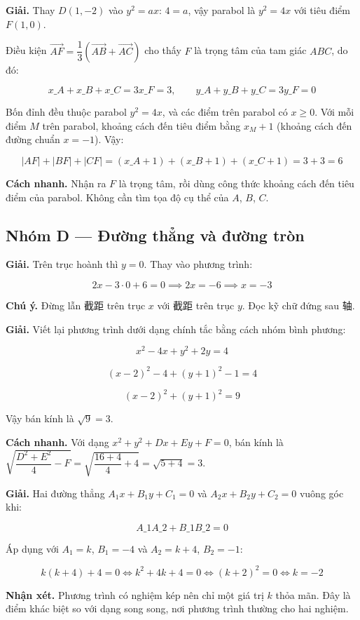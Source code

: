 \documentclass[11pt, a4paper]{article}
\begin{document}
\begin{dapan}[19 — Đáp án C]
\textbf{Giải.} Thay $D(1,-2)$ vào $y^2 = ax$: $4 = a$, vậy parabol là $y^2 = 4x$ với tiêu điểm $F(1, 0)$.

Điều kiện $\overrightarrow{AF} = \dfrac{1}{3}(\overrightarrow{AB} + \overrightarrow{AC})$ cho thấy $F$ là trọng tâm của tam giác $ABC$, do đó:

$$x\_A + x\_B + x\_C = 3x\_F = 3, \qquad y\_A + y\_B + y\_C = 3y\_F = 0$$

Bốn đỉnh đều thuộc parabol $y^2 = 4x$, và các điểm trên parabol có $x \ge 0$. Với mỗi điểm $M$ trên parabol, khoảng cách đến tiêu điểm bằng $x_M + 1$ (khoảng cách đến đường chuẩn $x = -1$). Vậy:

$$\lvert AF \rvert + \lvert BF \rvert + \lvert CF \rvert = (x\_A + 1) + (x\_B + 1) + (x\_C + 1) = 3 + 3 = 6$$

\textbf{Cách nhanh.} Nhận ra $F$ là trọng tâm, rồi dùng công thức khoảng cách đến tiêu điểm của parabol. Không cần tìm tọa độ cụ thể của $A$, $B$, $C$.
\end{dapan}

\subsection*{Nhóm D — Đường thẳng và đường tròn}

\begin{dapan}[20 — Đáp án A]
\textbf{Giải.} Trên trục hoành thì $y = 0$. Thay vào phương trình:

$$2x - 3 \cdot 0 + 6 = 0 \implies 2x = -6 \implies x = -3$$

\textbf{Chú ý.} Đừng lẫn 截距 trên trục $x$ với 截距 trên trục $y$. Đọc kỹ chữ đứng sau 轴.
\end{dapan}

\begin{dapan}[21 — Đáp án C]
\textbf{Giải.} Viết lại phương trình dưới dạng chính tắc bằng cách nhóm bình phương:

$$x^2 - 4x + y^2 + 2y = 4$$

$$(x - 2)^2 - 4 + (y + 1)^2 - 1 = 4$$

$$(x - 2)^2 + (y + 1)^2 = 9$$

Vậy bán kính là $\sqrt{9} = 3$.

\textbf{Cách nhanh.} Với dạng $x^2 + y^2 + Dx + Ey + F = 0$, bán kính là $\sqrt{\dfrac{D^2 + E^2}{4} - F} = \sqrt{\dfrac{16 + 4}{4} + 4} = \sqrt{5 + 4} = 3$.
\end{dapan}

\begin{dapan}[22 — Đáp án B]
\textbf{Giải.} Hai đường thẳng $A_1x + B_1y + C_1 = 0$ và $A_2x + B_2y + C_2 = 0$ vuông góc khi:

$$A\_1A\_2 + B\_1B\_2 = 0$$

Áp dụng với $A_1 = k$, $B_1 = -4$ và $A_2 = k+4$, $B_2 = -1$:

$$k(k+4) + 4 = 0 \iff k^2 + 4k + 4 = 0 \iff (k+2)^2 = 0 \iff k = -2$$

\textbf{Nhận xét.} Phương trình có nghiệm kép nên chỉ một giá trị $k$ thỏa mãn. Đây là điểm khác biệt so với dạng song song, nơi phương trình thường cho hai nghiệm.
\end{dapan}
\end{document}
